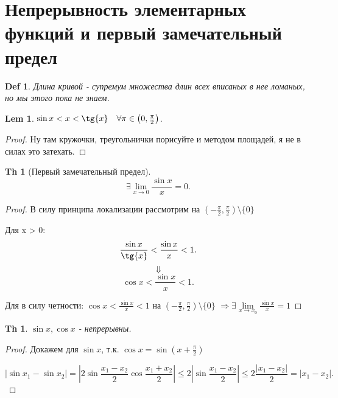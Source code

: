 \documentclass[a5paper, 10pt]{article}
\theoremstyle{plain}
\newtheorem{theorem}{Th}
\newtheorem*{theorem_}{Th}
\newtheorem{definition}{Def}
\newtheorem{lemma}{Lem}
\newcommand{\Rarrow}{\Rightarrow}
\begin{document}
    \section{Непрерывность элементарных функций и первый замечательный предел}

    \begin{definition}
        Длина кривой - супремум множества длин всех вписаных в нее ломаных, но мы этого пока
        не знаем.
    \end{definition}

    \begin{lemma}
        $ \sin{x} < x < \tg{x} \quad \forall \pi \in \left(0, \frac{\pi}{2}\right) $.
    \end{lemma}

    \begin{proof}
        Ну там кружочки, треугольнички порисуйте и методом площадей, я не в силах это затехать.
    \end{proof}

    \begin{theorem_}[Первый замечательный предел]
        \[
            \exists \lim\limits_{x \to 0} \frac{\sin{x}}{x}= 0
        .\]
    \end{theorem_}

    \begin{proof}
        В силу принципа локализации рассмотрим на
        $ \left( - \frac{\pi}{2}, \frac{\pi}{2} \right) \setminus \{ 0 \} $

        Для x > 0:
        \[
            \frac{\sin{x}}{\tg{x}} < \frac{\sin{x}}{x} < 1
            .\] \[ \Downarrow \] \[
            \cos{x} < \frac{\sin{x}}{x} < 1
        .\]

        Для в силу четности:
            $ \cos{x} < \frac{\sin{x}}{x} < 1 $ на
        $ \left( - \frac{\pi}{2}, \frac{\pi}{2} \right) \setminus \{ 0 \} $
        $ \Rarrow \exists \lim\limits_{x \to x_0} \frac{\sin{x}}{x}= 1 $
    \end{proof}

    \begin{theorem}
        $ \sin{x}, \cos{x} $ - непрерывны.
    \end{theorem}

    \begin{proof}
        Докажем для $ \sin{x} $, т.к. $ \cos{x} = \sin{\left( x + \frac{\pi}{2} \right) } $

        \[
        \left| \sin{x_1} - \sin{x_2} \right| =
    \left| 2 \sin{ \frac{x_1-x_2}{2}} \cos{ \frac{x_1 + x_2}{2}} \right|
    \leq 2 \left| \sin{ \frac{x_1 - x_2}{2}} \right| \leq
    2 \frac{|x_1-x_2|}{2} = \left| x_1-x_2 \right|
        .\]
    \end{proof}
\end{document}
